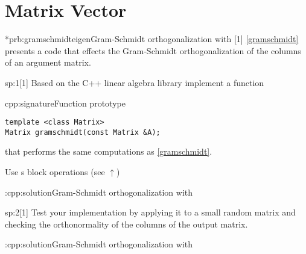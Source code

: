 \chapter{Matrix Vector}

\begin{samproblem}*{prb:gramschmidteigen}{Gram-Schmidt orthogonalization with \eigen{}}[1]{
\cref{gramschmidt} presents a \matlab{} code that effects the Gram-Schmidt
  orthogonalization of the columns of an argument matrix. 
}

\begin{subproblem}{sp:1}[1]
  Based on the C++ linear algebra library \eigen{} implement a function

  \begin{samcode}[C++-code]{cpp:signature}{Function prototype}
    \begin{lstlisting}[style=cpp]
template <class Matrix>  
Matrix gramschmidt(const Matrix &A);
    \end{lstlisting}
  \end{samcode}
  that performs the same computations as \cref{gramschmidt}. 

  \begin{samhint}
    Use \eigen{}s block operations (see \href{https://eigen.tuxfamily.org/dox/group__TutorialBlockOperations.html}{$\uparrow$})
  \end{samhint}

  \begin{samsolution}
    \begin{samcode}[C++-code]{\cpl:cpp:solution}{Gram-Schmidt orthogonalization with \eigen{}}
    \end{samcode}
  \end{samsolution}

\end{subproblem}

\begin{subproblem}{sp:2}[1]
  \label{sp:strassen:2}
  Test your implementation by applying it to a small random matrix
  and checking the orthonormality of the columns of the output
  matrix.

  \begin{samsolution}
    \begin{samcode}[C++-code]{\cpl:cpp:solution}{Gram-Schmidt orthogonalization with \eigen{}}
    \end{samcode}
  \end{samsolution}

\end{subproblem}

\end{samproblem}


